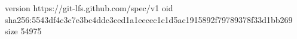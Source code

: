 version https://git-lfs.github.com/spec/v1
oid sha256:5543df4c3c7e3bc4ddc3ced1a1eecec1c1d5ac1915892f79789378f33d1bb269
size 54975
